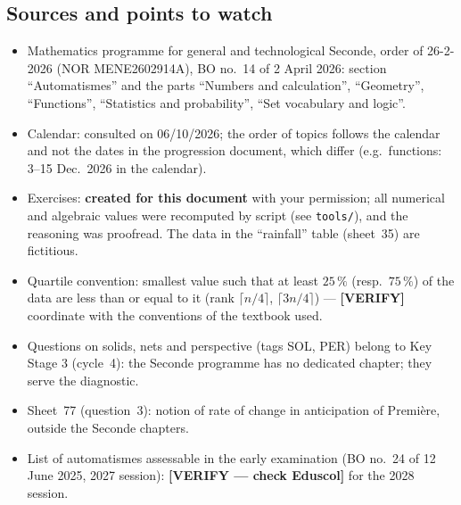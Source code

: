 \subsection*{Sources and points to watch}
\begin{itemize}[leftmargin=1.2em,itemsep=2pt]
  \item Mathematics programme for general and technological Seconde, order of 26-2-2026 (NOR MENE2602914A), BO no.~14 of 2 April 2026: section ``Automatismes'' and the parts ``Numbers and calculation'', ``Geometry'', ``Functions'', ``Statistics and probability'', ``Set vocabulary and logic''.
  \item Calendar: consulted on 06/10/2026; the order of topics follows the calendar and not the dates in the progression document, which differ (e.g.\ functions: 3--15 Dec.\ 2026 in the calendar).
  \item Exercises: \textbf{created for this document} with your permission; all numerical and algebraic values were recomputed by script (see \texttt{tools/}), and the reasoning was proofread. The data in the ``rainfall'' table (sheet~35) are fictitious.
  \item Quartile convention: smallest value such that at least $25\,\%$ (resp.\ $75\,\%$) of the data are less than or equal to it (rank $\lceil n/4\rceil$, $\lceil3n/4\rceil$) --- \textbf{[VERIFY]} coordinate with the conventions of the textbook used.
  \item Questions on solids, nets and perspective (tags SOL, PER) belong to Key Stage 3 (cycle~4): the Seconde programme has no dedicated chapter; they serve the diagnostic.
  \item Sheet~77 (question~3): notion of rate of change in anticipation of Première, outside the Seconde chapters.
  \item List of automatismes assessable in the early examination (BO no.~24 of 12 June 2025, 2027 session): \textbf{[VERIFY --- check Eduscol]} for the 2028 session.
\end{itemize}
